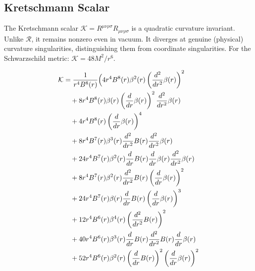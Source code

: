 \documentclass[11pt,a4paper]{article}
\begin{document}
\subsection{Kretschmann Scalar}
The Kretschmann scalar $\mathcal{K} = R^{\mu\nu\rho\sigma} R_{\mu\nu\rho\sigma}$ is a quadratic curvature invariant. Unlike $\mathcal{R}$, it remains nonzero even in vacuum. It diverges at genuine (physical) curvature singularities, distinguishing them from coordinate singularities. For the Schwarzschild metric: $\mathcal{K} = 48M^2/r^6$.
\begin{tcolorbox}[colback=boxblue,colframe=black!40,title=\textbf{Kretschmann scalar},breakable]
\begin{align*}
  \mathcal{K} &= \frac{1}{r^{4} B^{8}{\left(r \right)}}\Bigl(4 r^{4} B^{8}{\left(r \right)} \beta^{2}{\left(r \right)} \left(\frac{d^{2}}{d r^{2}} \beta{\left(r \right)}\right)^{2} \\
  &\quad + 8 r^{4} B^{8}{\left(r \right)} \beta{\left(r \right)} \left(\frac{d}{d r} \beta{\left(r \right)}\right)^{2} \frac{d^{2}}{d r^{2}} \beta{\left(r \right)} \\
  &\quad + 4 r^{4} B^{8}{\left(r \right)} \left(\frac{d}{d r} \beta{\left(r \right)}\right)^{4} \\
  &\quad + 8 r^{4} B^{7}{\left(r \right)} \beta^{3}{\left(r \right)} \frac{d^{2}}{d r^{2}} B{\left(r \right)} \frac{d^{2}}{d r^{2}} \beta{\left(r \right)} \\
  &\quad + 24 r^{4} B^{7}{\left(r \right)} \beta^{2}{\left(r \right)} \frac{d}{d r} B{\left(r \right)} \frac{d}{d r} \beta{\left(r \right)} \frac{d^{2}}{d r^{2}} \beta{\left(r \right)} \\
  &\quad + 8 r^{4} B^{7}{\left(r \right)} \beta^{2}{\left(r \right)} \frac{d^{2}}{d r^{2}} B{\left(r \right)} \left(\frac{d}{d r} \beta{\left(r \right)}\right)^{2} \\
  &\quad + 24 r^{4} B^{7}{\left(r \right)} \beta{\left(r \right)} \frac{d}{d r} B{\left(r \right)} \left(\frac{d}{d r} \beta{\left(r \right)}\right)^{3} \\
  &\quad + 12 r^{4} B^{6}{\left(r \right)} \beta^{4}{\left(r \right)} \left(\frac{d^{2}}{d r^{2}} B{\left(r \right)}\right)^{2} \\
  &\quad + 40 r^{4} B^{6}{\left(r \right)} \beta^{3}{\left(r \right)} \frac{d}{d r} B{\left(r \right)} \frac{d^{2}}{d r^{2}} B{\left(r \right)} \frac{d}{d r} \beta{\left(r \right)} \\
  &\quad + 52 r^{4} B^{6}{\left(r \right)} \beta^{2}{\left(r \right)} \left(\frac{d}{d r} B{\left(r \right)}\right)^{2} \left(\frac{d}{d r} \beta{\left(r \right)}\right)^{2} \\

\end{align*}
\end{tcolorbox}
\end{document}
